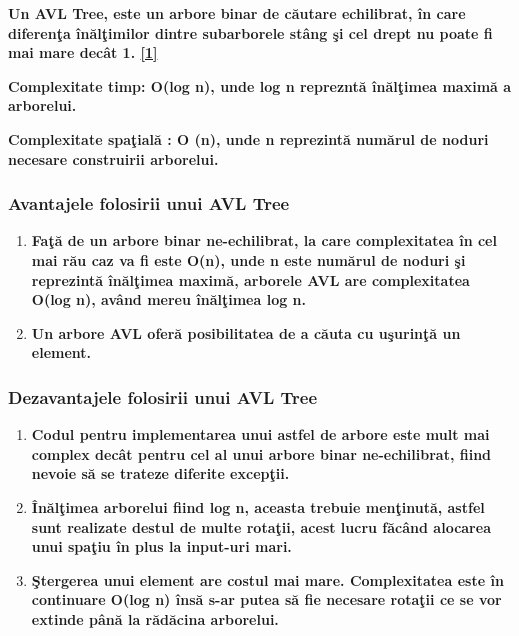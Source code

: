 \documentclass[12pt]{article}
\begin{document}
\textbf{\hspace{7mm}Un AVL Tree, este un arbore binar de c\u{a}utare echilibrat, \^{i}n care diferen\c{t}a \^{i}n\u{a}l\c{t}imilor dintre subarborele st\^{a}ng \c{s}i cel drept nu poate fi mai mare dec\^{a}t 1. \hyperlink{page.14}{[1]} }

\textbf{\hspace{7mm} Complexitate timp: O(log n), unde log n repreznt\u{a} \^{i}n\u{a}l\c{t}imea maxim\u{a} a arborelui. }

\textbf{\hspace{7mm} Complexitate spa\c{t}ial\u{a} : O (n), unde n reprezint\u{a} num\u{a}rul de noduri necesare construirii arborelui.}

\subsubsection{Avantajele folosirii unui AVL Tree}

\begin{enumerate}

\item{\textbf{Fa\c{t}\u{a} de un arbore binar ne-echilibrat, la care complexitatea \^{i}n cel mai r\u{a}u caz va fi este O(n), unde n este num\u{a}rul de noduri \c{s}i reprezint\u{a} \^{i}n\u{a}l\c{t}imea maxim\u{a}, arborele AVL are complexitatea O(log n), av\^{a}nd mereu \^{i}n\u{a}l\c{t}imea log n.}}
\item{\textbf{Un arbore AVL ofer\u{a} posibilitatea de a c\u{a}uta cu u\c{s}urin\c{t}\u{a} un element. }}

\end{enumerate}

\subsubsection{Dezavantajele folosirii unui AVL Tree}

\begin{enumerate}

\item{\textbf{Codul pentru implementarea unui astfel de arbore este mult mai complex dec\^{a}t pentru cel al unui arbore binar ne-echilibrat, fiind nevoie s\u{a} se trateze diferite excep\c{t}ii. }}

\item{\textbf{\^{I}n\u{a}l\c{t}imea arborelui fiind log n, aceasta trebuie men\c{t}inut\u{a}, astfel sunt realizate destul de multe rota\c{t}ii, acest lucru f\u{a}c\^{a}nd alocarea unui spa\c{t}iu \^{i}n plus la input-uri mari.} }

\item{\textbf{\c{S}tergerea unui element are costul mai mare. Complexitatea este \^{i}n continuare O(log n) \^{i}ns\u{a} s-ar putea s\u{a} fie necesare rota\c{t}ii ce se vor extinde p\^{a}n\u{a} la r\u{a}d\u{a}cina arborelui. }}
\end{enumerate}
\end{document}
